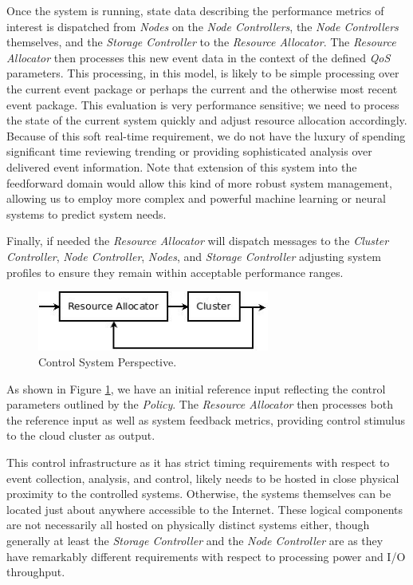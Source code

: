 \documentclass[times, 10pt,twocolumn]{article}
\begin{document}
Once the system is running, state data describing the performance metrics of interest is dispatched from \textit{Nodes} on the \textit{Node Controllers}, the \textit{Node Controllers} themselves, and the \textit{Storage Controller} to the \textit{Resource Allocator}.  The \textit{Resource Allocator} then processes this new event data in the context of the defined \textit{QoS} parameters.  This processing, in this model, is likely to be simple processing over the current event package or perhaps the current and the otherwise most recent event package.  This evaluation is very performance sensitive; we need to process the state of the current system quickly and adjust resource allocation accordingly.  Because of this soft real-time requirement, we do not have the luxury of spending significant time reviewing trending or providing sophisticated analysis over delivered event information.  Note that extension of this system into the feedforward domain would allow this kind of more robust system management, allowing us to employ more complex and powerful machine learning or neural systems to predict system needs.

Finally, if needed the \textit{Resource Allocator} will dispatch messages to the \textit{Cluster Controller}, \textit{Node Controller}, \textit{Nodes}, and \textit{Storage Controller} adjusting system profiles to ensure they remain within acceptable performance ranges.

\begin{figure}[!t]
\centering
\includegraphics[width=3in]{feedback}
\caption{Control System Perspective.}
\label{fig:feedback}
\end{figure}

As shown in Figure \ref{fig:feedback}, we have an initial reference input reflecting the control parameters outlined by the \textit{Policy}.  The \textit{Resource Allocator} then processes both the reference input as well as system feedback metrics, providing control stimulus to the cloud cluster as output.

This control infrastructure as it has strict timing requirements with respect to event collection, analysis, and control, likely needs to be hosted in close physical proximity to the controlled systems.  Otherwise, the systems themselves can be located just about anywhere accessible to the Internet.  These logical components are not necessarily all hosted on physically distinct systems either, though generally at least the \textit{Storage Controller} and the \textit{Node Controller} are as they have remarkably different requirements with respect to processing power and I/O throughput.
\end{document}
